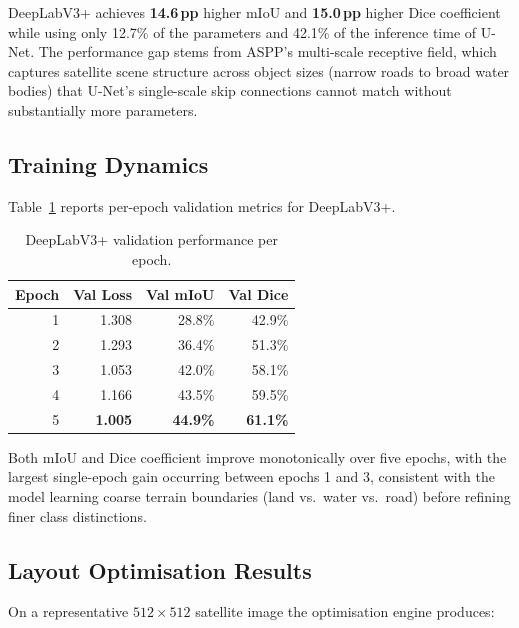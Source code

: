 \documentclass[twocolumn]{article}
\begin{document}
DeepLabV3+ achieves \textbf{14.6\,pp} higher mIoU and \textbf{15.0\,pp} higher Dice coefficient
while using only 12.7\% of the parameters and 42.1\% of the inference time of U-Net.
The performance gap stems from ASPP's multi-scale receptive field, which captures satellite scene
structure across object sizes (narrow roads to broad water bodies) that U-Net's single-scale skip
connections cannot match without substantially more parameters.

\subsection{Training Dynamics}

Table~\ref{tab:training} reports per-epoch validation metrics for DeepLabV3+.

\begin{table}[h]
  \caption{DeepLabV3+ validation performance per epoch.}
  \label{tab:training}
  \centering\small
  \begin{tabular}{@{}rrrr@{}}
    \toprule
    \textbf{Epoch} & \textbf{Val Loss} & \textbf{Val mIoU} & \textbf{Val Dice} \\
    \midrule
    1 & 1.308 & 28.8\% & 42.9\% \\
    2 & 1.293 & 36.4\% & 51.3\% \\
    3 & 1.053 & 42.0\% & 58.1\% \\
    4 & 1.166 & 43.5\% & 59.5\% \\
    5 & \textbf{1.005} & \textbf{44.9\%} & \textbf{61.1\%} \\
    \bottomrule
  \end{tabular}
\end{table}

Both mIoU and Dice coefficient improve monotonically over five epochs, with the largest single-epoch
gain occurring between epochs 1 and 3, consistent with the model learning coarse terrain boundaries
(land vs.\ water vs.\ road) before refining finer class distinctions.

\subsection{Layout Optimisation Results}

On a representative $512{\times}512$ satellite image the optimisation engine produces:
\end{document}
